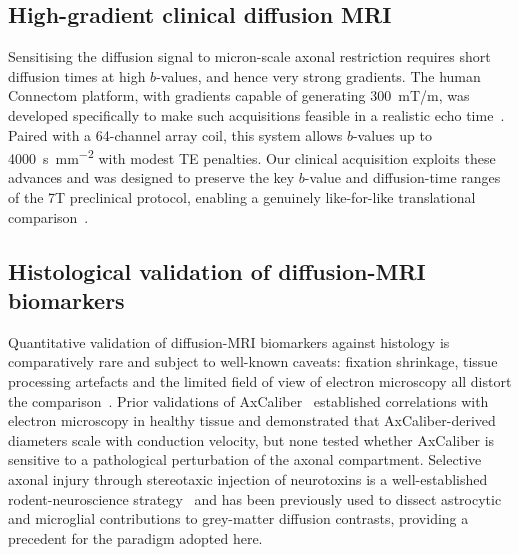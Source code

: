 \documentclass[11pt]{article}
\begin{document}
\subsection*{High-gradient clinical diffusion MRI}
Sensitising the diffusion signal to micron-scale axonal restriction requires short diffusion times at high $b$-values, and hence very strong gradients. The human Connectom platform, with gradients capable of generating \SI{300}{mT/m}, was developed specifically to make such acquisitions feasible in a realistic echo time~\cite{jones2018microstructural}. Paired with a 64-channel array coil, this system allows $b$-values up to \SI{4000}{\second\per\square\milli\meter} with modest TE penalties. Our clinical acquisition exploits these advances and was designed to preserve the key $b$-value and diffusion-time ranges of the 7T preclinical protocol, enabling a genuinely like-for-like translational comparison~\cite{desantis2019whole}.

\subsection*{Histological validation of diffusion-MRI biomarkers}
Quantitative validation of diffusion-MRI biomarkers against histology is comparatively rare and subject to well-known caveats: fixation shrinkage, tissue processing artefacts and the limited field of view of electron microscopy all distort the comparison~\cite{horowitz2015axon}. Prior validations of AxCaliber~\cite{barazany2009invivo,horowitz2015axon} established correlations with electron microscopy in healthy tissue and demonstrated that AxCaliber-derived diameters scale with conduction velocity, but none tested whether AxCaliber is sensitive to a pathological perturbation of the axonal compartment. Selective axonal injury through stereotaxic injection of neurotoxins is a well-established rodent-neuroscience strategy~\cite{conforti2014wallerian,adalbert2012intra} and has been previously used to dissect astrocytic and microglial contributions to grey-matter diffusion contrasts, providing a precedent for the paradigm adopted here.
\end{document}

